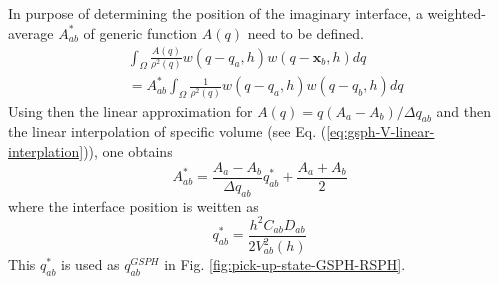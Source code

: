 In purpose of determining the position of the imaginary interface, a weighted-average $A_{ab}^{\ast}$ of generic function $A(q)$ need to be defined.
\begin{equation}
\begin{split}
& \int_{\Omega} \frac{A\left(q \right)}{\rho^2(q)} w\left(q -q_a, h\right) w(q - \textbf{x}_{b}, h) dq \\
& =A_{ab}^{\ast} \int_{\Omega} \frac{1}{\rho^2(q)} w\left(q -q_a, h\right) w(q - q_{b}, h) dq
\end{split}
\label{eq:GSPH-f-interpolation-def}
\end{equation}
Using then the linear approximation for $A(q) = q(A_a - A_b)/ \Delta q_{ab}$ and then the linear interpolation of specific volume (see Eq. (\ref{eq:gsph-V-linear-interplation})), one obtains 
\begin{equation}
A_{ab}^{\ast} = \frac{A_a - A_b}{\Delta q_{ab}} q_{ab}^{\ast} + \frac{A_a + A_b}{2}
\label{eq:GSPH-f-interpolation-evaluation}
\end{equation}
where the interface position is weitten as
\begin{equation}
q_{ab}^{\ast} = \frac{h^2 C_{ab} D_{ab}}{2V_{ab}^2(h)}
\label{eq:GSPH-f-interpolation-s-star}
\end{equation}
This $q_{ab}^{\ast}$ is used as $q_{ab}^{GSPH}$ in Fig. \ref{fig:pick-up-state-GSPH-RSPH}.